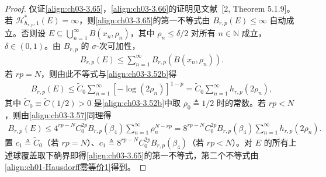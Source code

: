 \documentclass[../../main.tex]{subfiles}%
\begin{document}
\begin{proof}
仅证\eqref{align:ch03-3.65}，\eqref{align:ch03-3.66}的证明见文献~[2, Theorem 5.1.9]。若 $\mathcal{H}^*_{h_{r,p},1}(E)=\infty$，则\eqref{align:ch03-3.65}的第一不等式由 $B_{r,p}(E)\leqslant\infty$ 自动成立。否则设 $E\subseteq\bigcup_{n=1}^\infty B(x_n,\rho_n)$，其中 $\rho_n\leqslant\delta/2$ 对所有 $n\in\mathbb{N}$ 成立，$\delta\in(0,1)$。由 $B_{r,p}$ 的 $\sigma$-次可加性，
\begin{align*}
B_{r,p}(E)\leqslant\sum_{n=1}^\infty B_{r,p}(B(x_n,\rho_n)).
\end{align*}
若 $rp=N$，则由此不等式与\eqref{align:ch03-3.52b}得
\begin{align*}
B_{r,p}(E)\leqslant\widetilde C_0\sum_{n=1}^\infty[-\log(2\rho_n)]^{1-p}
=\widetilde C_0\sum_{n=1}^\infty h_{r,p}(2\rho_n),
\end{align*}
其中 $\widetilde C_0\equiv\widetilde C(1/2)>0$ 是\eqref{align:ch03-3.52b}中取 $\rho_0\triangleq1/2$ 时的常数。若 $rp<N$，则由\eqref{align:ch03-3.57}同理得
\begin{align*}
B_{r,p}(E)\leqslant 4^{rp-N}C_0^{2p}B_{r,p}(\beta_4)\sum_{n=1}^\infty\rho_n^{N-rp}
=8^{rp-N}C_0^{2p}B_{r,p}(\beta_4)\sum_{n=1}^\infty h_{r,p}(2\rho_n).
\end{align*}
置 $c_1\triangleq\widetilde C_0$（若 $rp=N$）、$c_1\triangleq8^{rp-N}C_0^{2p}B_{r,p}(\beta_4)$（若 $rp<N$）。对 $E$ 的所有上述球覆盖取下确界即得\eqref{align:ch03-3.65}的第一不等式，第二个不等式由\eqref{align:ch01-Hausdorff零等价1}得到。
\end{proof}
\end{document}
